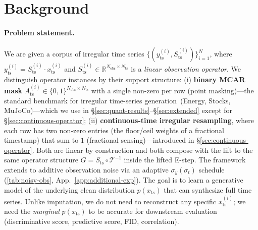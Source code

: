 \documentclass{article}
\theoremstyle{plain}
\theoremstyle{definition}
\theoremstyle{remark}
\newcommand{\imgts}{\mathcal{T}^{-1}}
\newcommand{\Nts}{N_{\mathrm{ts}}}
\newcommand{\Nobs}{N_{\mathrm{obs}}}
\newcommand{\Ats}{A_{\mathrm{ts}}}
\newcommand{\yts}{y_{\mathrm{ts}}}
\newcommand{\xts}{x_{\mathrm{ts}}}
\begin{document}
\vspace{-2mm}
\section{Background}
\label{sec:background}
\vspace{-1mm}

\paragraph{Problem statement.}
We are given a corpus of irregular time series $\{(\yts^{(i)}, S_{\mathrm{ts}}^{(i)})\}_{i=1}^N$, where $\yts^{(i)} = S_{\mathrm{ts}}^{(i)} \cdot \xts^{(i)}$ and $S_{\mathrm{ts}}^{(i)} \in \mathbb{R}^{\Nobs \times \Nts}$ is a \emph{linear observation operator}. We distinguish operator instances by their support structure: (i) \textbf{binary MCAR mask} $\Ats^{(i)} \in \{0,1\}^{\Nobs \times \Nts}$ with a single non-zero per row (point masking)---the standard benchmark for irregular time-series generation~(Energy, Stocks, MuJoCo)---which we use in \S\ref{sec:quant-results}--\S\ref{sec:extended} except for \S\ref{sec:continuous-operator}; (ii) \textbf{continuous-time irregular resampling}, where each row has two non-zero entries (the floor/ceil weights of a fractional timestamp) that sum to $1$ (fractional sensing)---introduced in \S\ref{sec:continuous-operator}. Both are linear by construction and both compose with the lift to the same operator structure $G = S_{\mathrm{ts}} \circ \imgts$ inside the lifted E-step. The framework extends to additive observation noise via an adaptive $\sigma_y(\sigma_t)$ schedule (\cref{tab:noisy-obs}, App.~\ref{app:additional-exp}). The goal is to learn a generative model of the underlying clean distribution $p(\xts)$ that can synthesize full time series. Unlike imputation, we do not need to reconstruct any specific $\xts^{(i)}$; we need the \emph{marginal} $p(\xts)$ to be accurate for downstream evaluation (discriminative score, predictive score, FID, correlation).
\end{document}
